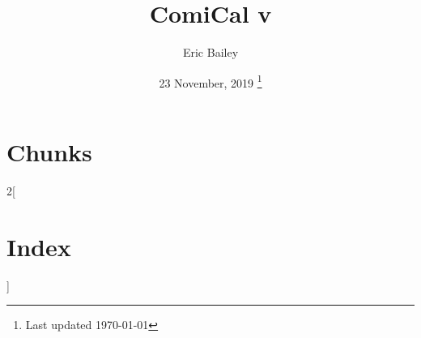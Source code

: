 \documentclass[a4paper,nobib,xelatex]{tufte-handout}
\title{ComiCal v\version}
\author{Eric Bailey}
\date{%
  23 November, 2019
  \thanks{Last updated \today}%
}
\begin{document}
\maketitle







\newpage
\section{Chunks}
\nowebchunks

\newpage
\begin{multicols}{2}[\section{Index}]
  \nowebindex
\end{multicols}

\newpage
\listoftodos[To-Do]
\end{document}
